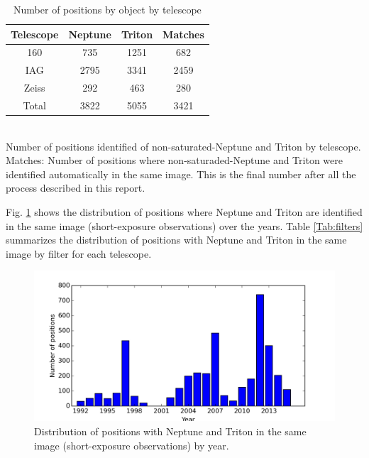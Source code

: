 \documentclass[12pt,a4paper]{report}
\begin{document}
\begin{table}[h]
\centering
\caption{Number of positions by object by telescope}
\label{Tab:dados}
\begin{tabular}{|c|c|c|c|}
\hline 
Telescope & Neptune & Triton & Matches \\ 
\hline
160 & 735 & 1251 & 682 \\
\hline
IAG & 2795 & 3341 & 2459 \\ 
\hline 
Zeiss & 292 & 463 & 280 \\ 
\hline 
Total & 3822 & 5055 & 3421 \\ 
\hline 
\end{tabular}
\\Number of positions identified of non-saturated-Neptune and Triton by telescope. Matches: Number of positions where non-saturaded-Neptune and Triton were identified automatically in the same image. This is the final number after all the process described in this report.
\end{table}

Fig. \ref{Fig:pos-dist} shows the distribution of positions where Neptune and Triton are identified in the same image (short-exposure observations) over the years. Table \ref{Tab:filters} summarizes the distribution of positions with Neptune and Triton in the same image by filter for each telescope.

\begin{figure}
\includegraphics[width=16.0cm]{pos-distribution.png} 
\caption{Distribution of positions with Neptune and Triton in the same image (short-exposure observations) by year.}
\label{Fig:pos-dist}
\end{figure}
\end{document}
